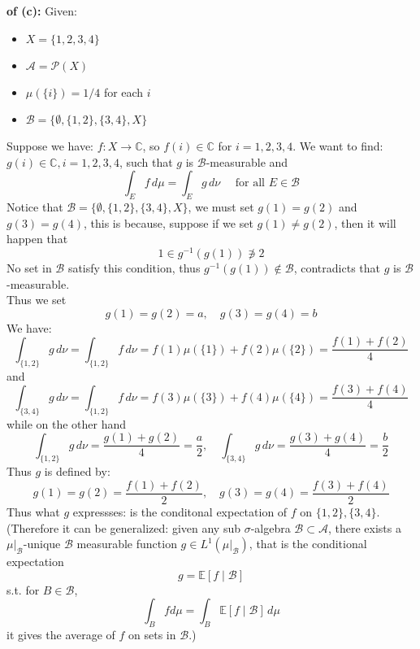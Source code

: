 \documentclass[lang=cn,11pt]{elegantbook}
\begin{document}
\begin{solution}
    \textbf{of (c):}
    Given:
\begin{itemize}
    \item $X=\{1,2,3,4\}$
    \item $\mathcal{A}=\mathcal{P}(X)$
    \item $\mu(\{i\})=1 / 4$ for each $i$
    \item $\mathcal{B}=\{\emptyset,\{1,2\},\{3,4\}, X\}$
\end{itemize}
Suppose we have: $f: X \rightarrow \mathbb{C}$, so $f(i) \in \mathbb{C}$ for $i=1,2,3,4$. We want to find: $g(i) \in \mathbb{C}, i=1,2,3,4$, such that $g$ is $\mathcal{B}$-measurable and $$
\int_E f \,d \mu=\int_E g \,d \nu \quad \text { for all } E \in \mathcal{B}
$$
Notice that $\mathcal{B}=\{\emptyset,\{1,2\},\{3,4\},X\}$, we must set $g(1) = g(2)$ and $g(3) = g(4)$, this is because, suppose if we set $g(1) \not = g(2)$, then it will happen that \[
1\in g^{-1} (g(1)) \not \ni 2
\]
No set in $\mathcal{B}$ satisfy this condition, thus $g^{-1} (g(1)) \not \in \mathcal{B}$, contradicts that $g$ is $\mathcal{B}$-measurable.\\
Thus we set \[
g(1) =g(2) = a,\quad g(3) = g(4) = b
\]We have: \[
\int_{\{1,2\}} g\, d\nu  = \int_{\{1,2\}} f\, d\nu = f(1)\mu(\{1\}) + f(2)\mu(\{2\}) = \frac{f(1)+ f(2)}{4}
\]and \[
\int_{\{3,4\}} g\, d\nu  = \int_{\{1,2\}} f\, d\nu = f(3)\mu(\{3\}) + f(4)\mu(\{4\}) = \frac{f(3)+ f(4)}{4}
\]
while on the other hand \[
\int_{\{1,2\}} g\, d\nu = \frac{g(1) + g(2)}{4} = \frac{a}{2},\quad \int_{\{3,4\}} g\, d\nu = \frac{g(3) + g(4)}{4} = \frac{b}{2}
\]
Thus $g$ is defined by: \[
g(1) =g(2) = \frac{f(1)+ f(2)}{2},\quad g(3) = g(4) = \frac{f(3)+ f(4)}{2}
\]
Thus what $g$ expressses: is the conditonal expectation of $f$ on $\{1,2\},\{3,4\}$.\\
(Therefore it can be generalized: given any sub $\sigma$-algebra $\mathcal{B} \subset \mathcal{A}$, there exists a $\mu|_{\mathcal{B}}$-unique $\mathcal{B}$ measurable function $g \in L^1(\mu|_{\mathcal{B}})$, that is the conditional expectation
$$
g=\mathbb{E}[f \mid \mathcal{B}]
$$
s.t. for $B \in \mathcal{B}$, $$
\int_B f d \mu=\int_B \mathbb{E}[f \mid \mathcal{B}] \,d \mu
$$
it gives the average of $f$ on sets in $\mathcal{B}$.)
\end{solution}



 
\end{document}
